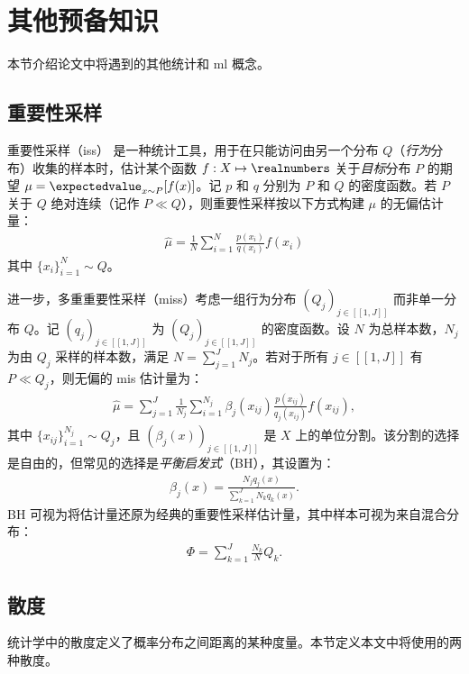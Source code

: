 \section{其他预备知识}
\label{sec:futher_prelim}
本节介绍论文中将遇到的其他统计和 \gls{ml} 概念。


\subsection{重要性采样}
\label{subsec:importance_sampling}

重要性采样（\Glspl{is}）\cite{mcbook} 是一种统计工具，用于在只能访问由另一个分布 $Q$（\emph{行为}分布）收集的样本时，估计某个函数 $f:X\mapsto \realnumbers$ 关于\emph{目标}分布 $P$ 的期望 $\mu = \expectedvalue_{x \sim P}[f(x)]$。记 $p$ 和 $q$ 分别为 $P$ 和 $Q$ 的密度函数。若 $P$ 关于 $Q$ 绝对连续（记作 $P \ll Q$），则重要性采样按以下方式构建 $\mu$ 的无偏估计量：
\begin{align*}
    \widehat{\mu} = \frac{1}{N}\sum_{i=1}^{N} \frac{p(x_{i})}{q(x_{i})}f(x_{i})
\end{align*}
其中 $\{x_{i}\}_{i=1}^{N} \sim Q$。

进一步，多重重要性采样（\glspl{mis}）考虑一组行为分布 $(Q_j)_{j\in[\![1,J]\!]}$ 而非单一分布 $Q$。记 $(q_j)_{j\in[\![1,J]\!]}$ 为 $(Q_j)_{j\in[\![1,J]\!]}$ 的密度函数。设 $N$ 为总样本数，$N_j$ 为由 $Q_j$ 采样的样本数，满足 $\textstyle N=\sum\nolimits_{j=1}^{J} N_j$。若对于所有 $j\in[\![1,J]\!]$ 有 $P \ll Q_j$，则无偏的 \gls{mis} 估计量为：
\begin{align*}
	\widehat{\mu} = \sum_{j=1}^J \frac{1}{N_j}\sum_{i=1}^{N_j} \beta_j(x_{ij})\frac{p(x_{ij})}{q_j(x_{ij})}f(x_{ij}),
\end{align*}
其中 $\{x_{ij}\}_{i=1}^{N_j} \sim Q_j$，且 $(\beta_j(x))_{j\in[\![1,J]\!]}$ 是 $X$ 上的单位分割。该分割的选择是自由的，但常见的选择是\emph{平衡启发式}（BH）\cite{veach1995monte}，其设置为：
\begin{align*}
    \beta_j(x)=\frac{N_j q_j(x)}{\sum_{k=1}^J N_k q_k(x)}.
\end{align*}
BH 可视为将估计量还原为经典的重要性采样估计量，其中样本可视为来自混合分布：
\begin{align*}
    \Phi = \sum_{k=1}^J\frac{N_k}{N}Q_k.
\end{align*}


\subsection{散度}
统计学中的散度定义了概率分布之间距离的某种度量。本节定义本文中将使用的两种散度。


